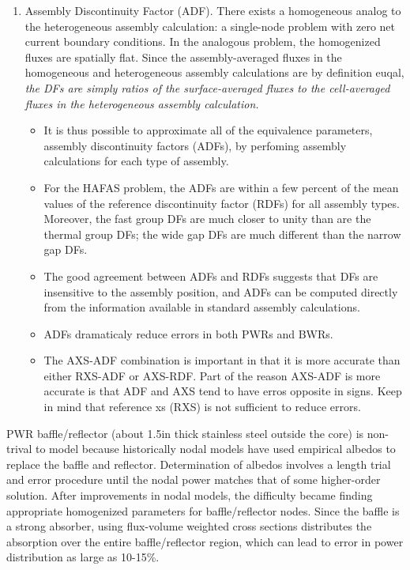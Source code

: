\documentclass{school-22.211-notes}
\begin{document}
\begin{enumerate}
\item Assembly Discontinuity Factor (ADF). There exists a homogeneous analog to the heterogeneous assembly calculation: a single-node problem with zero net current boundary conditions. In the analogous problem, the homogenized fluxes are spatially flat. Since the assembly-averaged fluxes in the homogeneous and heterogeneous assembly calculations are by definition euqal, \textit{the DFs are simply ratios of the surface-averaged fluxes to the cell-averaged fluxes in the heterogeneous assembly calculation.} 
  \begin{itemize}
  \item It is thus possible to approximate all of the equivalence parameters, assembly discontinuity factors (ADFs), by perfoming assembly calculations for each type of assembly. 
  \item For the HAFAS problem, the ADFs are within a few percent of the mean values of the reference discontinuity factor (RDFs) for all assembly types. Moreover, the fast group DFs are much closer to unity than are the thermal group DFs; the wide gap DFs are much different than the narrow gap DFs. 
  \item The good agreement between ADFs and RDFs suggests that DFs are insensitive to the assembly position, and ADFs can be computed directly from the information available in standard assembly calculations. 
  \item ADFs dramaticaly reduce errors in both PWRs and BWRs. 
  \item The AXS-ADF combination is important in that it is more accurate than either RXS-ADF or AXS-RDF. Part of the reason AXS-ADF is more accurate is that ADF and AXS tend to have erros opposite in signs. Keep in mind that reference xs (RXS) is not sufficient to reduce errors. 
  \end{itemize}
\end{enumerate}

\clearpage
{}
PWR baffle/reflector (about 1.5in thick stainless steel outside the core) is non-trival to model because historically nodal models have used empirical albedos to replace the baffle and reflector. Determination of albedos involves a length trial and error procedure until the nodal power matches that of some higher-order solution. After improvements in nodal models, the difficulty became finding appropriate homogenized parameters for baffle/reflector nodes. Since the baffle is a strong absorber, using flux-volume weighted cross sections distributes the absorption over the entire baffle/reflector region, which can lead to error in power distribution as large as 10-15\%. 
\end{document}
